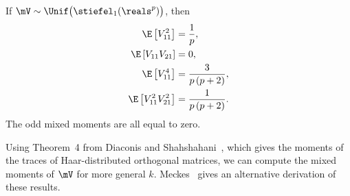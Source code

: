 \begin{lemma}\label{L:stiefel-1-moments}
    If $\mV \sim \Unif\big( \stiefel_1(\reals^p) \big)$, then
    \begin{subequations}
    \begin{align*}
        \E \left[ V_{11}^2 \right] 
            &= \frac{1}{p}, \\
        \E \left[ V_{11} V_{21} \right] 
            &= 0, \\
        \E \left[ V_{11}^4 \right] 
            &= \frac{3}{p \, (p + 2)}, \\
        \E \left[ V_{11}^2 V_{21}^2 \right] 
            &= \frac{1}{p \, (p + 2)}.
    \end{align*}
    \end{subequations}
    The odd mixed moments are all equal to zero.
\end{lemma}

Using Theorem~4 from Diaconis and Shahshahani~\cite{diaconis1994erm},
which gives the moments of the traces of Haar-distributed orthogonal
matrices, we can compute the mixed moments of $\mV$ for more general $k$.
Meckes~\cite{meckes2006ivs} gives an alternative derivation of these
results.

